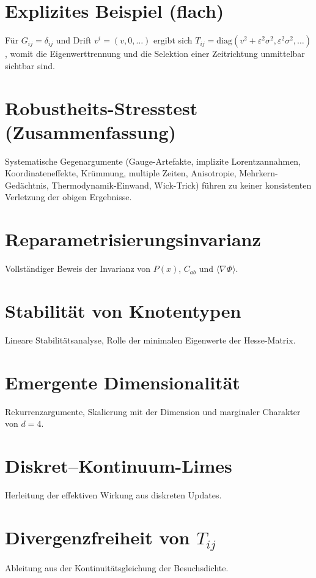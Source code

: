 \documentclass[11pt,a4paper]{article}
\begin{document}
\section{Explizites Beispiel (flach)}
F\"ur $G_{ij}=\delta_{ij}$ und Drift $v^i=(v,0,\dots)$ ergibt sich $T_{ij}=\mathrm{diag}(v^2+\varepsilon^2\sigma^2,\varepsilon^2\sigma^2,\dots)$, womit die Eigenwerttrennung und die Selektion einer Zeitrichtung unmittelbar sichtbar sind.

\section{Robustheits-Stresstest (Zusammenfassung)}
Systematische Gegenargumente (Gauge-Artefakte, implizite Lorentzannahmen, Koordinateneffekte, Kr\"ummung, multiple Zeiten, Anisotropie, Mehrkern-Ged\"achtnis, Thermodynamik-Einwand, Wick-Trick) f\"uhren zu keiner konsistenten Verletzung der obigen Ergebnisse.


\section{Reparametrisierungsinvarianz}

Vollständiger Beweis der Invarianz von $P(x)$, $C_{ab}$ und $\langle \nabla \Phi \rangle$.

\section{Stabilit\"at von Knotentypen}

Lineare Stabilitätsanalyse, Rolle der minimalen Eigenwerte der Hesse-Matrix.

\section{Emergente Dimensionalit\"at}

Rekurrenzargumente, Skalierung mit der Dimension und marginaler Charakter von $d=4$.

\section{Diskret--Kontinuum-Limes}

Herleitung der effektiven Wirkung aus diskreten Updates.

\section{Divergenzfreiheit von $T_{ij}$}

Ableitung aus der Kontinuitätsgleichung der Besuchsdichte.



\end{document}
